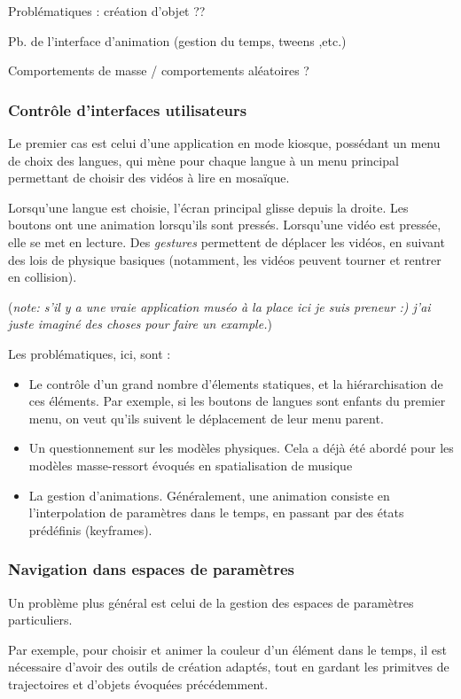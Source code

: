\documentclass[french]{article}
\begin{document}
Problématiques : création d'objet ??

Pb. de l'interface d'animation (gestion du temps, tweens ,etc.)

Comportements de masse / comportements aléatoires ?

\subsubsection{Contrôle d'interfaces utilisateurs}
Le premier cas est celui d'une application en mode kiosque, possédant un menu de choix des langues, qui mène pour chaque langue à un menu principal permettant de choisir des vidéos à lire en mosaïque.

Lorsqu'une langue est choisie, l'écran principal glisse depuis la droite. Les boutons ont une animation lorsqu'ils sont pressés. Lorsqu'une vidéo est pressée, elle se met en lecture. Des \textit{gestures} permettent de déplacer les vidéos, en suivant des lois de physique basiques (notamment, les vidéos peuvent tourner et rentrer en collision).

(\textit{note:  s'il y a une vraie application muséo à la place ici je suis preneur :) j'ai juste imaginé des choses pour faire un example.})

Les problématiques, ici, sont : 
\begin{itemize}
\item Le contrôle d'un grand nombre d'élements statiques, et la hiérarchisation de ces éléments. Par exemple, si les boutons de langues sont enfants du premier menu, on veut qu'ils suivent le déplacement de leur menu parent.
\item Un questionnement sur les modèles physiques. Cela a déjà été abordé pour les modèles masse-ressort évoqués en spatialisation de musique %
\item La gestion d'animations. Généralement, une animation consiste en l'interpolation de paramètres dans le temps, en passant par des états prédéfinis (keyframes).
\end{itemize}

\subsubsection{Navigation dans espaces de paramètres}
Un problème plus général est celui de la gestion des espaces de paramètres particuliers.

Par exemple, pour choisir et animer la couleur d'un élément dans le temps, il est nécessaire d'avoir des outils de création adaptés, tout en gardant les primitves de trajectoires et d'objets évoquées précédemment.
\end{document}
